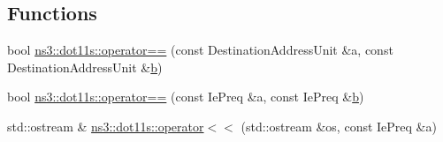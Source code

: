 \subsection*{Functions}
\begin{DoxyCompactItemize}
\item 
bool \hyperlink{namespacens3_1_1dot11s_a136414d52b2511da5e24c811cc8ded62}{ns3\+::dot11s\+::operator==} (const Destination\+Address\+Unit \&a, const Destination\+Address\+Unit \&\hyperlink{lte__pathloss_8m_a21ad0bd836b90d08f4cf640b4c298e7c}{b})
\item 
bool \hyperlink{namespacens3_1_1dot11s_abd1a7ef48675b476f64073fd1555d277}{ns3\+::dot11s\+::operator==} (const Ie\+Preq \&a, const Ie\+Preq \&\hyperlink{lte__pathloss_8m_a21ad0bd836b90d08f4cf640b4c298e7c}{b})
\item 
std\+::ostream \& \hyperlink{namespacens3_1_1dot11s_a538df889b845ab6e5b2cd9d61a45f33d}{ns3\+::dot11s\+::operator$<$$<$} (std\+::ostream \&os, const Ie\+Preq \&a)
\end{DoxyCompactItemize}

